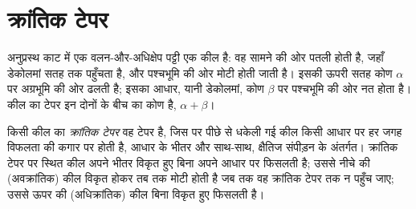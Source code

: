 \begin{omfigure}
\par{}\label{fig:b3:orogenic-wedges:duplex}
\end{omfigure}


\section{क्रांतिक टेपर}\label{sec:b3:orogenic-wedges:taper}

अनुप्रस्थ काट में एक वलन-और-अधिक्षेप पट्टी एक कील है: वह सामने की ओर पतली होती है,
जहाँ डेकोलमां सतह तक पहुँचता है, और पश्चभूमि की ओर मोटी होती जाती है।
इसकी ऊपरी सतह कोण $\alpha$ पर अग्रभूमि की ओर ढलती है;
इसका आधार, यानी डेकोलमां, कोण $\beta$ पर पश्चभूमि की ओर नत होता है।
कील का टेपर इन दोनों के बीच का कोण है, $\alpha + \beta$।

\begin{definition}[क्रांतिक टेपर]\label{def:b3:orogenic-wedges:critical-taper}
किसी कील का \emph{क्रांतिक टेपर} वह टेपर है, जिस पर पीछे से धकेली गई कील
किसी आधार पर हर जगह विफलता की कगार पर होती है,
आधार के भीतर और साथ-साथ, क्षैतिज संपीड़न के अंतर्गत। क्रांतिक टेपर पर स्थित कील
अपने भीतर विकृत हुए बिना अपने आधार पर फिसलती है; उससे नीचे की (अवक्रांतिक) कील
विकृत होकर तब तक मोटी होती है जब तक वह क्रांतिक टेपर तक न पहुँच जाए; उससे ऊपर की (अधिक्रांतिक) कील
बिना विकृत हुए फिसलती है।
\end{definition}

